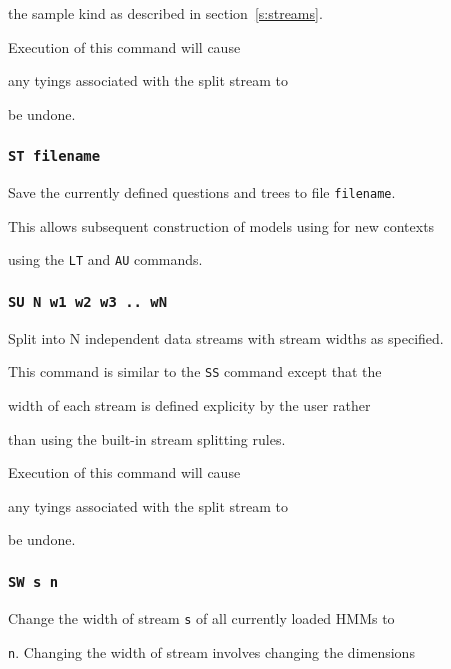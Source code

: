 the sample kind as described in section~\ref{s:streams}.


Execution of this command will cause


any tyings associated with the split stream to


be undone.





\subsubsection*{\tt ST filename}





Save the currently defined questions and trees to file \texttt{filename}.


This allows subsequent construction of models using for new contexts


using the \texttt{LT} and \texttt{AU} commands.





\subsubsection*{\tt SU N w1 w2 w3 .. wN}





Split into N independent data streams with stream widths as specified.


This command is similar to the \texttt{SS} command except that the 


width of each stream is defined explicity by the user rather


than using the built-in stream splitting rules.


Execution of this command will cause


any tyings associated with the split stream to


be undone.





\subsubsection*{\tt SW s n}





Change the width of stream \texttt{s} of all currently loaded HMMs to 


\texttt{n}.  Changing the width of stream involves changing the dimensions


